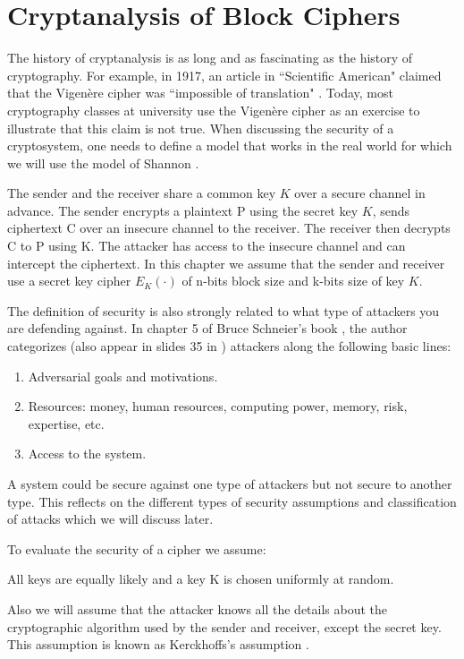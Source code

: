 \chapter{Cryptanalysis of Block Ciphers} \label{ch:CoBC}
\label{Cryptanalysis of block ciphers}
%
The history of cryptanalysis is as long and as fascinating as the history of cryptography. For example, in 1917, an article in ``Scientific American" claimed that the Vigen\`{e}re cipher was ``impossible of translation" \cite{knudsen1998block}. Today, most cryptography classes at university use the Vigen\`{e}re cipher as an exercise to illustrate that this claim is not true. When discussing the security of a cryptosystem, one needs to define a model that works in the real world for which we will use the model of Shannon \cite{shannon1949communication}.


The sender and the receiver share a common key $K$ over a secure channel in advance. The sender encrypts a plaintext P using the secret key $K$, sends ciphertext C over an insecure channel to the receiver. The receiver then decrypts C to P using K. The attacker has access to the insecure channel and can intercept the ciphertext. In this chapter we assume that the sender and receiver use a secret key cipher $E_{K}(\cdot)$ of n-bits block size and k-bits size of key $K$. 

The definition of security is also strongly related to what type of attackers you are defending against. In chapter 5 of Bruce Schneier's book \cite{schneier2006beyond}, the author categorizes (also appear in slides 35 in \cite{SlidesCompSec}) attackers along the following basic lines: 
	
\begin{enumerate}
	\item Adversarial goals and motivations.
	\item Resources: money, human resources, computing power, memory, risk, expertise, etc.
	\item Access to the system.
\end{enumerate}

A system could be secure against one type of attackers but not secure to another type. This reflects on the different types of security assumptions and classification of attacks which we will discuss later. 

To evaluate the security of a cipher we assume:

\begin{myAssumption}
	All keys are equally likely and a key K is chosen uniformly at random.
\end{myAssumption}
Also we will assume that the attacker knows all the details about the cryptographic algorithm used by the sender and receiver, except the secret key. This assumption is known as Kerckhoffs's assumption \cite{kahn1996codebreakers}.


